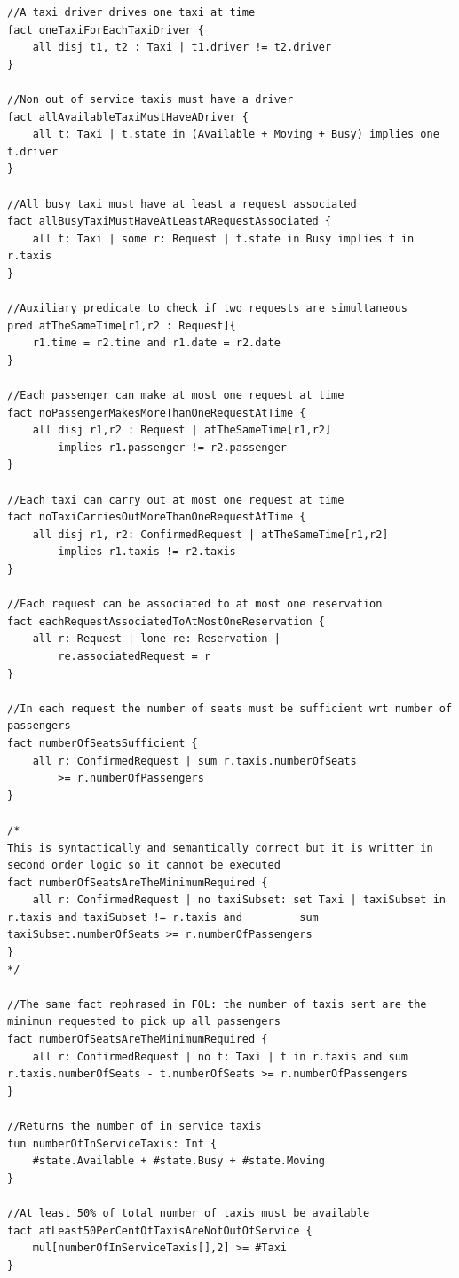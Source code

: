 \begin{lstlisting}[breaklines=true]
//A taxi driver drives one taxi at time 
fact oneTaxiForEachTaxiDriver { 	
	all disj t1, t2 : Taxi | t1.driver != t2.driver 
}

//Non out of service taxis must have a driver 
fact allAvailableTaxiMustHaveADriver { 	
	all t: Taxi | t.state in (Available + Moving + Busy) implies one t.driver 
}

//All busy taxi must have at least a request associated 
fact allBusyTaxiMustHaveAtLeastARequestAssociated { 	
	all t: Taxi | some r: Request | t.state in Busy implies t in r.taxis 
}

//Auxiliary predicate to check if two requests are simultaneous 
pred atTheSameTime[r1,r2 : Request]{ 	
	r1.time = r2.time and r1.date = r2.date 
}

//Each passenger can make at most one request at time 
fact noPassengerMakesMoreThanOneRequestAtTime { 	
	all disj r1,r2 : Request | atTheSameTime[r1,r2] 
		implies r1.passenger != r2.passenger 
}

//Each taxi can carry out at most one request at time 
fact noTaxiCarriesOutMoreThanOneRequestAtTime { 	
	all disj r1, r2: ConfirmedRequest | atTheSameTime[r1,r2] 
		implies r1.taxis != r2.taxis 
}

//Each request can be associated to at most one reservation 
fact eachRequestAssociatedToAtMostOneReservation { 	
	all r: Request | lone re: Reservation | 
		re.associatedRequest = r 
}

//In each request the number of seats must be sufficient wrt number of passengers
fact numberOfSeatsSufficient { 	
	all r: ConfirmedRequest | sum r.taxis.numberOfSeats 
		>= r.numberOfPassengers 
}

/* 
This is syntactically and semantically correct but it is writter in second order logic so it cannot be executed 
fact numberOfSeatsAreTheMinimumRequired { 	
	all r: ConfirmedRequest | no taxiSubset: set Taxi | taxiSubset in r.taxis and taxiSubset != r.taxis and 		sum taxiSubset.numberOfSeats >= r.numberOfPassengers 
}
*/

//The same fact rephrased in FOL: the number of taxis sent are the minimun requested to pick up all passengers 
fact numberOfSeatsAreTheMinimumRequired { 	
	all r: ConfirmedRequest | no t: Taxi | t in r.taxis and sum r.taxis.numberOfSeats - t.numberOfSeats >= r.numberOfPassengers 
}

//Returns the number of in service taxis
fun numberOfInServiceTaxis: Int { 	
	#state.Available + #state.Busy + #state.Moving
}

//At least 50% of total number of taxis must be available
fact atLeast50PerCentOfTaxisAreNotOutOfService { 	
	mul[numberOfInServiceTaxis[],2] >= #Taxi 
}
\end{lstlisting}



